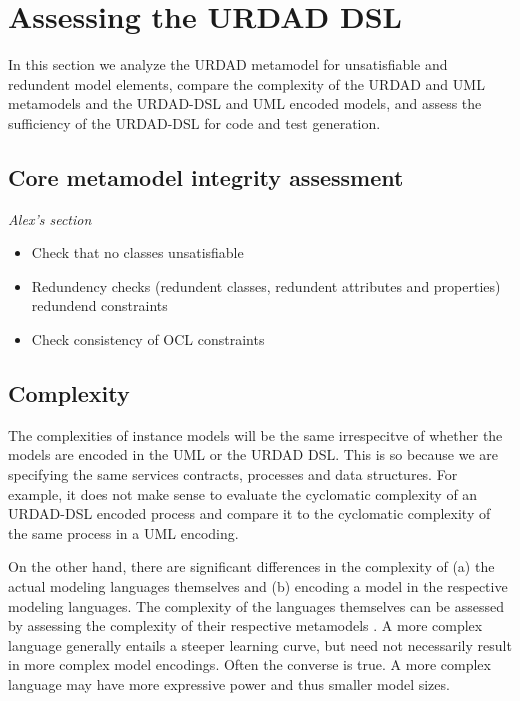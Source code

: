 \section{Assessing the URDAD DSL \label{sec:assessment}}

In this section we analyze the URDAD metamodel for unsatisfiable and redundent model elements, compare the complexity of the URDAD and UML metamodels and the URDAD-DSL and UML encoded models, and assess the sufficiency of the URDAD-DSL for code and test generation.


\subsection{Core metamodel integrity assessment}

\emph{Alex's section}


\begin{itemize}
  \item Check that no classes unsatisfiable
  \item Redundency checks (redundent classes, redundent attributes and properties) redundend constraints
  \item Check consistency of OCL constraints
\end{itemize}


\subsection{Complexity}

The complexities of instance models will be the same irrespecitve of whether the models are encoded in the UML or the URDAD DSL. This is so because we are specifying the same services contracts, processes and data structures. For example, it does not make sense to evaluate the cyclomatic complexity of an URDAD-DSL encoded process and compare it to the cyclomatic complexity of the same process in a UML encoding.

On the other hand, there are significant differences in the complexity of (a) the actual modeling languages themselves and (b) encoding a model in the respective modeling languages. The complexity of the languages themselves can be assessed by assessing the complexity of their respective metamodels \cite{mohagheghi_evaluating_2007}. A more complex language generally entails a steeper learning curve, but need not necessarily result in more complex model encodings. Often the converse is true. A more complex language may have more expressive power and thus smaller model sizes. 

